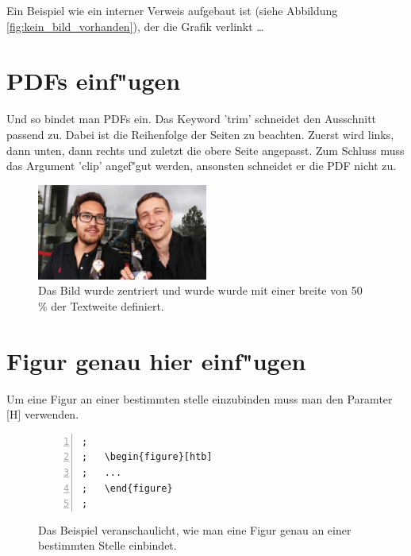 Ein Beispiel wie ein interner Verweis aufgebaut ist (siehe Abbildung \ref{fig:kein_bild_vorhanden}), der die Grafik verlinkt \dots

\section{PDFs einf"ugen}
\label{sec:PDFeinfuegen}
Und so bindet man PDFs ein. Das Keyword 'trim' schneidet den Ausschnitt passend zu. Dabei ist die Reihenfolge der Seiten zu beachten. Zuerst wird links, dann unten, dann rechts und zuletzt die obere Seite angepasst. Zum Schluss muss das Argument 'clip' angef"gut werden, ansonsten schneidet er die PDF nicht zu.

\begin{figure}[htb]
  \centering  
  \includegraphics[width=0.5\textwidth, trim = 10mm 10mm 10mm 10mm, clip]{img/teamfoto.pdf}
  \caption{Das Bild wurde zentriert und wurde wurde mit einer breite von 50 \% der Textweite definiert.} 
  \label{fig:Teambild}
\end{figure}
\FloatBarrier


\section{Figur genau hier einf"ugen}
\label{sec:FigurHierEinfuegen}
Um eine Figur an einer bestimmten stelle einzubinden muss man den Paramter [H] verwenden.

\FloatBarrier
\begin{figure}[htb]
\begin{lstlisting}[backgroundcolor={\color{white}},
basicstyle={\normalsize\sffamily},
breaklines=true,
frame={bottomline,topline, rightline},
language=HTML,
numbers=left,
showstringspaces=false,
xleftmargin=22pt]	
; 
;	\begin{figure}[htb]
;	...
;	\end{figure}
;
\end{lstlisting}
  \caption[Die Anweisung, wie man eine Figure genau hier einbindet.]{Das Beispiel veranschaulicht, wie man eine Figur genau an einer bestimmten Stelle einbindet.}
\label{lst:FigurGenauHier}
\end{figure}


